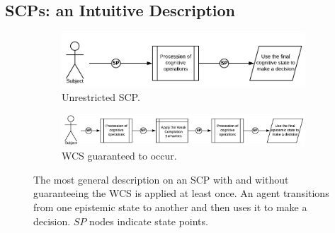 \documentclass{article}
\begin{document}
\subsection{SCPs: an Intuitive Description}
\begin{figure}
\begin{subfigure}{.35\textwidth}
  \centering
  \includegraphics[width=0.97\linewidth]{general}
  \caption{Unrestricted SCP.}
  \label{fig:scp_general}
\end{subfigure}%
\begin{subfigure}{.65\textwidth}
  \centering
  \includegraphics[width=0.97\linewidth]{generalWCS}
  \caption{WCS guaranteed to occur.}
  \label{fig:sfig2}
\end{subfigure}
\caption{The most general description on an SCP with and without guaranteeing the WCS is applied at least once. An agent transitions from one epistemic state to another and then uses it to make a decision. $SP$ nodes indicate state points.}
\label{fig:scp_generalWCS}
\end{figure}
\end{document}
